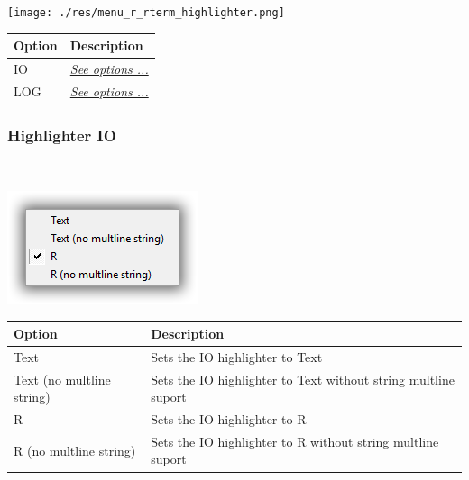 \texttt{[image: ./res/menu\_r\_rterm\_highlighter.png]}\\

\begin{scriptsize}
  \begin{tabularx}{\textwidth}{>{\hsize=0.3\hsize}X>{\hsize=0.7\hsize}X}\\
    \hline
    \textbf{Option} & \textbf{Description} \\
    \hline
    IO & \textit{\href{\#menu\_r\_rterm\_highlighter\_IO}{See options ...}} \\
    LOG & \textit{\href{\#menu\_r\_rterm\_highlighter\_Log}{See options ...}} \\
    \hline
  \end{tabularx}
\end{scriptsize}


\hypertarget{menu_r_rterm_highlighter_IO}{}
\subsubsection{Highlighter IO}\\

\includegraphics[scale=0.50]{./res/menu_r_rterm_highlighter_io.png}\\

\begin{scriptsize}
  \begin{tabularx}{\textwidth}{>{\hsize=0.3\hsize}X>{\hsize=0.7\hsize}X}\\
    \hline
    \textbf{Option} & \textbf{Description} \\
    \hline
    Text & Sets the IO highlighter to Text \\
    Text (no multline string) & Sets the IO highlighter to Text without string multline suport \\
    R & Sets the IO highlighter to R \\
    R (no multline string) & Sets the IO highlighter to R without string multline suport \\
    \hline
  \end{tabularx}
\end{scriptsize}


